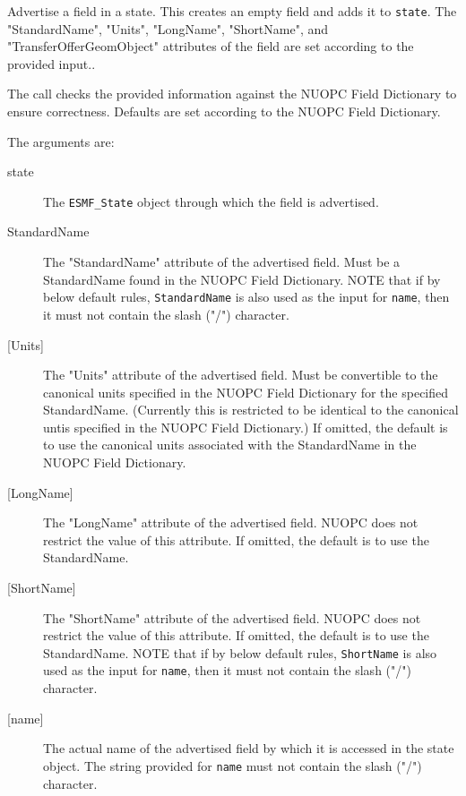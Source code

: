      \label{NUOPC_AdvertiseField}
     Advertise a field in a state. This creates an empty field and adds it to
     {\tt state}. The "StandardName", "Units", "LongName", "ShortName", and 
     "TransferOfferGeomObject" attributes of the field are set according to the
     provided input..
  
     The call checks the provided information against the NUOPC Field Dictionary
     to ensure correctness. Defaults are set according to the NUOPC Field 
     Dictionary.
  
     The arguments are:
     \begin{description}
     \item[state]
       The {\tt ESMF\_State} object through which the field is advertised.
     \item[StandardName]
       The "StandardName" attribute of the advertised field. Must be a 
       StandardName found in the NUOPC Field Dictionary.\newline
       NOTE that if by below default rules, {\tt StandardName} is also used as
       the input for {\tt name}, then it must not contain the slash ("/")
       character.
     \item[{[Units]}]
       The "Units" attribute of the advertised field. Must be convertible to the
       canonical units specified in the NUOPC Field Dictionary for the specified
       StandardName. (Currently this is restricted to be identical to the 
       canonical untis specified in the NUOPC Field Dictionary.)
       If omitted, the default is to use the canonical units associated with
       the StandardName in the NUOPC Field Dictionary.
     \item[{[LongName]}]
       The "LongName" attribute of the advertised field. NUOPC does not restrict
       the value of this attribute.
       If omitted, the default is to use the StandardName.
     \item[{[ShortName]}]
       The "ShortName" attribute of the advertised field. NUOPC does not restrict
       the value of this attribute.
       If omitted, the default is to use the StandardName.\newline
       NOTE that if by below default rules, {\tt ShortName} is also used as
       the input for {\tt name}, then it must not contain the slash ("/")
       character.
     \item[{[name]}]
       The actual name of the advertised field by which it is accessed in the
       state object. The string provided for {\tt name} must not contain the
       slash ("/") character.

\end{description}
